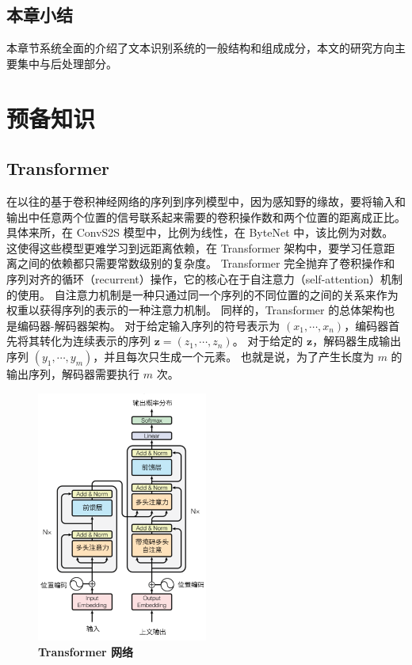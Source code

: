 \section{本章小结}
本章节系统全面的介绍了文本识别系统的一般结构和组成成分，本文的研究方向主要集中与后处理部分。

\chapter{预备知识}
\label{chap:prerequisite}

\section{Transformer}
在以往的基于卷积神经网络的序列到序列模型中，因为感知野的缘故，要将输入和输出中任意两个位置的信号联系起来需要的卷积操作数和两个位置的距离成正比。
具体来所，在 ConvS2S\cite{cs2s} 模型中，比例为线性，在 ByteNet\cite{ByteNet} 中，该比例为对数。
这使得这些模型更难学习到远距离依赖，在 Transformer 架构\cite{transformer}中，要学习任意距离之间的依赖都只需要常数级别的复杂度。
Transformer 完全抛弃了卷积操作和序列对齐的循环（recurrent）操作，它的核心在于自注意力（self-attention）机制的使用。
自注意力机制是一种只通过同一个序列的不同位置的之间的关系来作为权重以获得序列的表示的一种注意力机制。
同样的，Transformer 的总体架构也是编码器-解码器架构。
对于给定输入序列的符号表示为 $(x_1, \cdots, x_n)$，编码器首先将其转化为连续表示的序列 $\bm{z} = (z_1, \cdots, z_n)$。
对于给定的 $\bm{z}$，解码器生成输出序列 $(y_1, \cdots, y_m)$，并且每次只生成一个元素。
也就是说，为了产生长度为 $m$ 的输出序列，解码器需要执行 $m$ 次。

\begin{figure}[h!]
	\centering
	\includegraphics[width=0.5\textwidth]{figure/resources/transformer.png}
	\caption{\textbf{Transformer 网络}\label{transformer}}
\end{figure}


